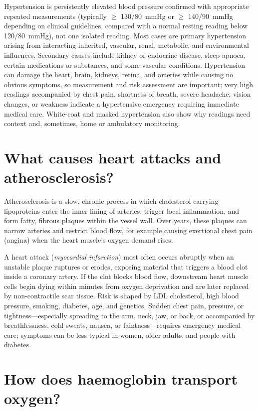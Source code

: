 \documentclass[11pt,oneside]{report}
\begin{document}
Hypertension is persistently elevated blood pressure confirmed with appropriate
repeated measurements (typically $\ge$ 130/80~mmHg or $\ge$ 140/90~mmHg
depending on clinical guidelines, compared with a normal resting reading below
120/80~mmHg), not one isolated reading. Most cases are primary
hypertension arising from interacting inherited, vascular, renal, metabolic,
and environmental influences. Secondary causes include kidney or endocrine
disease, sleep apnoea, certain medications or substances, and some vascular
conditions. Hypertension can damage the heart, brain, kidneys, retina, and
arteries while causing no obvious symptoms, so measurement and risk assessment
are important; very high readings accompanied by chest pain, shortness of
breath, severe headache, vision changes, or weakness indicate a hypertensive
emergency requiring immediate medical care. White-coat and masked hypertension
also show why readings need context and, sometimes, home or ambulatory
monitoring.

\section{What causes heart attacks and atherosclerosis?}

Atherosclerosis is a slow, chronic process in which cholesterol-carrying
lipoproteins enter the inner lining of arteries, trigger local inflammation,
and form fatty, fibrous plaques within the vessel wall. Over years, these
plaques can narrow arteries and restrict blood flow, for example causing
exertional chest pain (angina) when the heart muscle's oxygen demand rises.

A heart attack (\emph{myocardial infarction}) most often occurs abruptly when an
unstable plaque ruptures or erodes, exposing material that triggers a blood clot
inside a coronary artery. If the clot blocks blood flow, downstream heart
muscle cells begin dying within minutes from oxygen deprivation and are later
replaced by non-contractile scar tissue. Risk is shaped by LDL cholesterol,
high blood pressure, smoking, diabetes, age, and genetics. Sudden chest pain,
pressure, or tightness---especially spreading to the arm, neck, jaw, or back,
or accompanied by breathlessness, cold sweats, nausea, or faintness---requires
emergency medical care; symptoms can be less typical in women, older adults,
and people with diabetes.

\section{How does haemoglobin transport oxygen?}
\end{document}

